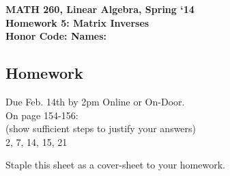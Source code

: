 \documentclass{article}
\begin{document}
\begin{flushleft}
	\bfseries{MATH 260, Linear Algebra, Spring `14}\\
	\bfseries{Homework 5:  Matrix Inverses}\\
	\bfseries{Honor Code:} \hspace{3.5in}\bfseries{Names:}\\
\end{flushleft}
\begin{flushleft}
\vspace{.5in}

\section*{Homework}
\LARGE Due Feb. 14th by 2pm Online or On-Door.\\
\normalsize
\vspace{0.25in}
On page 154-156:\\
(show sufficient steps to justify your answers)\\
2, 7, 14, 15, 21

\vspace{1in}
\Large
Staple this sheet as a cover-sheet to your homework.

\end{flushleft}
\end{document}
